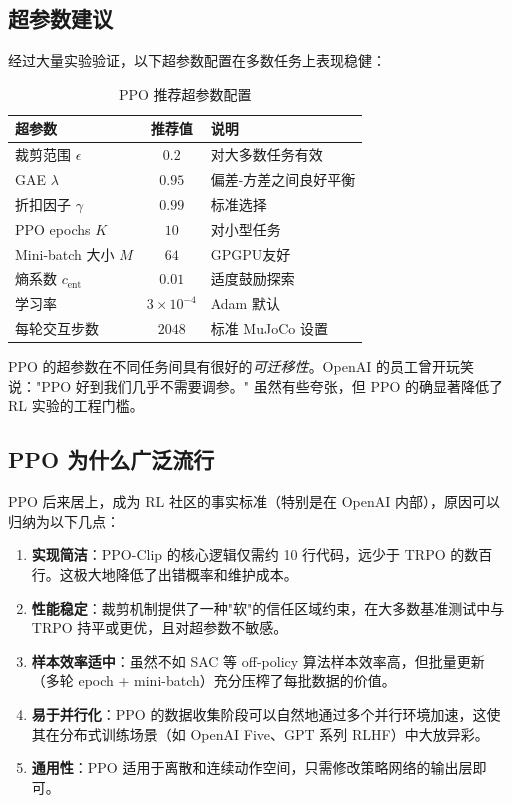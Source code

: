 \subsection{超参数建议}

经过大量实验验证，以下超参数配置在多数任务上表现稳健：

\begin{table}[H]
\centering
\caption{PPO 推荐超参数配置}
\begin{tabular}{@{}lcl@{}}
\toprule
\textbf{超参数} & \textbf{推荐值} & \textbf{说明} \\
\midrule
裁剪范围 $\epsilon$ & $0.2$ & 对大多数任务有效 \\
GAE $\lambda$       & $0.95$ & 偏差-方差之间良好平衡 \\
折扣因子 $\gamma$    & $0.99$ & 标准选择 \\
PPO epochs $K$     & $10$   & 对小型任务 \\
Mini-batch 大小 $M$ & $64$   & GPGPU友好 \\
熵系数 $c_{\text{ent}}$ & $0.01$ & 适度鼓励探索 \\
学习率               & $3\times10^{-4}$ & Adam 默认 \\
每轮交互步数           & $2048$  & 标准 MuJoCo 设置 \\
\bottomrule
\end{tabular}
\label{tab:ppo_hyper}
\end{table}

\begin{remark}
PPO 的超参数在不同任务间具有很好的\emph{可迁移性}。OpenAI 的员工曾开玩笑说："PPO 好到我们几乎不需要调参。" 虽然有些夸张，但 PPO 的确显著降低了 RL 实验的工程门槛。
\end{remark}

\subsection{PPO 为什么广泛流行}

PPO 后来居上，成为 RL 社区的事实标准（特别是在 OpenAI 内部），原因可以归纳为以下几点：

\begin{enumerate}
    \item \textbf{实现简洁}：PPO-Clip 的核心逻辑仅需约 10 行代码，远少于 TRPO 的数百行。这极大地降低了出错概率和维护成本。
    \item \textbf{性能稳定}：裁剪机制提供了一种"软"的信任区域约束，在大多数基准测试中与 TRPO 持平或更优，且对超参数不敏感。
    \item \textbf{样本效率适中}：虽然不如 SAC 等 off-policy 算法样本效率高，但批量更新（多轮 epoch + mini-batch）充分压榨了每批数据的价值。
    \item \textbf{易于并行化}：PPO 的数据收集阶段可以自然地通过多个并行环境加速，这使其在分布式训练场景（如 OpenAI Five、GPT 系列 RLHF）中大放异彩。
    \item \textbf{通用性}：PPO 适用于离散和连续动作空间，只需修改策略网络的输出层即可。
\end{enumerate}

